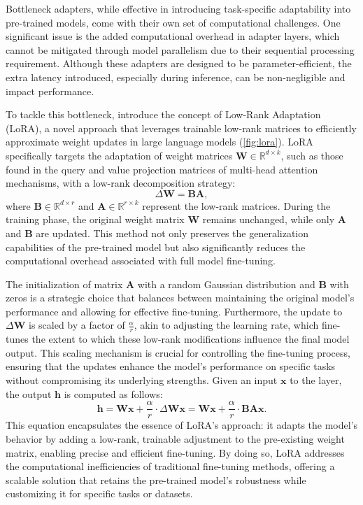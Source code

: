 Bottleneck adapters, while effective in introducing task-specific adaptability into pre-trained models, come with their own set of computational challenges. One significant issue is the added computational overhead in adapter layers, which cannot be mitigated through model parallelism due to their sequential processing requirement. Although these adapters are designed to be parameter-efficient, the extra latency introduced, especially during inference, can be non-negligible and impact performance.

To tackle this bottleneck, \citet{hu2022lora} introduce the concept of Low-Rank Adaptation (LoRA), a novel approach that leverages trainable low-rank matrices to efficiently approximate weight updates in large language models (\cref{fig:lora}). LoRA specifically targets the adaptation of weight matrices $\textbf{W}\in\mathbb{R}^{d\times k}$, such as those found in the query and value projection matrices of multi-head attention mechanisms, with a low-rank decomposition strategy:
\begin{equation}
\Delta \textbf{W} = \textbf{B}\textbf{A},
\end{equation}
where $\textbf{B}\in\mathbb{R}^{d\times r}$ and $\textbf{A}\in\mathbb{R}^{r\times k}$ represent the low-rank matrices. During the training phase, the original weight matrix $\textbf{W}$ remains unchanged, while only $\textbf{A}$ and $\textbf{B}$ are updated. This method not only preserves the generalization capabilities of the pre-trained model but also significantly reduces the computational overhead associated with full model fine-tuning.

The initialization of matrix $\textbf{A}$ with a random Gaussian distribution and $\textbf{B}$ with zeros is a strategic choice that balances between maintaining the original model's performance and allowing for effective fine-tuning. Furthermore, the update to $\Delta \textbf{W}$ is scaled by a factor of $\frac{\alpha}{r}$, akin to adjusting the learning rate, which fine-tunes the extent to which these low-rank modifications influence the final model output. This scaling mechanism is crucial for controlling the fine-tuning process, ensuring that the updates enhance the model's performance on specific tasks without compromising its underlying strengths.
Given an input $\textbf{x}$ to the layer, the output $\textbf{h}$ is computed as follows:
\begin{equation}
\textbf{h} = \textbf{W}\textbf{x} + \frac{\alpha}{r}\cdot \Delta \textbf{W}\textbf{x} = \textbf{W}\textbf{x} + \frac{\alpha}{r}\cdot \textbf{B}\textbf{A}\textbf{x}.
\end{equation}
This equation encapsulates the essence of LoRA's approach: it adapts the model's behavior by adding a low-rank, trainable adjustment to the pre-existing weight matrix, enabling precise and efficient fine-tuning. By doing so, LoRA addresses the computational inefficiencies of traditional fine-tuning methods, offering a scalable solution that retains the pre-trained model's robustness while customizing it for specific tasks or datasets.

